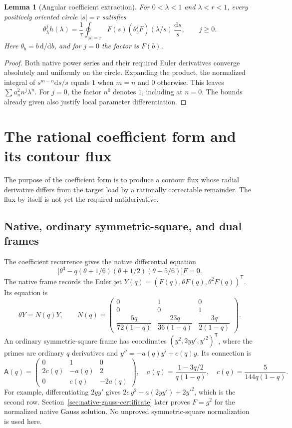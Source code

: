 \documentclass[11pt,a4paper]{article}
\newtheorem{lemma}[theorem]{Lemma}
\newcommand{\dd}{\mathrm d}
\newcommand{\tr}{\mathsf T}
\begin{document}
\begin{lemma}[Angular coefficient extraction]\label{lem:hadamard}
For $0<\lambda<1$ and $\lambda<r<1$, every positively oriented circle
$|s|=r$ satisfies
\begin{equation}\label{eq:hadamard}
 \theta_\lambda^j h(\lambda)
 =\frac1\tau\oint_{|s|=r}
       F(s)(\theta_b^j F)(\lambda/s)\,\frac{\dd s}{s},
 \qquad j\geq0.
\end{equation}
Here $\theta_b=b\,\dd/\dd b$, and for $j=0$ the factor is $F(b)$.
\end{lemma}
\begin{proof}
Both native power series and their required Euler derivatives converge
absolutely and uniformly on the circle. Expanding the product, the
normalized integral of $s^{m-n}\dd s/s$ equals $1$ when $m=n$ and
$0$ otherwise. This leaves $\sum a_n^2n^j\lambda^n$.
For $j=0$, the factor $n^0$ denotes $1$, including at $n=0$.
The bounds already given also justify local parameter differentiation.
\end{proof}

\section{The rational coefficient form and its contour flux}
\label{sec:form}
The purpose of the coefficient form is to produce a contour flux whose
radial derivative differs from the target load by a rationally correctable
remainder. The flux by itself is not yet the required antiderivative.

\subsection{Native, ordinary symmetric-square, and dual frames}
The coefficient recurrence gives the native differential equation
\[
 \bigl[\theta^3-q(\theta+1/6)(\theta+1/2)(\theta+5/6)\bigr]F=0.
\]
The native frame records the Euler jet
$Y(q)=(F(q),\theta F(q),\theta^2F(q))^{\tr}$. Its equation is
\begin{equation}\label{eq:native-system}
 \theta Y=N(q)Y,\qquad
 N(q)=\begin{pmatrix}
 0&1&0\\0&0&1\\
 \dfrac{5q}{72(1-q)}&\dfrac{23q}{36(1-q)}&\dfrac{3q}{2(1-q)}
 \end{pmatrix}.
\end{equation}
An ordinary symmetric-square frame has coordinates
$(y^2,2yy',y'^2)^{\tr}$, where the primes are ordinary $q$ derivatives
and $y''=-a(q)y'+c(q)y$. Its connection is
\begin{equation}\label{eq:sym-connection}
 \mathsf A(q)=\begin{pmatrix}0&1&0\\2c(q)&-a(q)&2\\0&c(q)&-2a(q)\end{pmatrix},
 \quad a(q)=\frac{1-3q/2}{q(1-q)},\quad
 c(q)=\frac5{144q(1-q)}.
\end{equation}
For example, differentiating $2yy'$ gives
$2c\,y^2-a(2yy')+2y'^2$, which is the second row.
Section~\ref{sec:native-gauss-certificate} later proves $F=g^2$ for the
normalized native Gauss solution. No unproved symmetric-square
normalization is used here.
\end{document}
